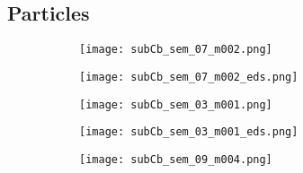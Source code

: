 \subsection{Particles}

\begin{figure}
    \centering
    \begin{subfigure}[t]{\textwidth}
        \caption{}\label{fig:subCb_silica}
          \begin{minipage}[t]{0.43\linewidth}
            \centering
            \texttt{[image: subCb\_sem\_07\_m002.png]}
          \end{minipage}
          \hfill
          \begin{minipage}[t]{0.43\linewidth}
            \centering
            \texttt{[image: subCb\_sem\_07\_m002\_eds.png]}
          \end{minipage}
          \begin{minipage}[t]{0.11\linewidth}
            \centering
            \atomicTable[&][&][&]
          \end{minipage}
    \end{subfigure}
    \par\bigskip
    \begin{subfigure}[t]{\textwidth}
        \caption{}\label{fig:subCb_Br-etch}
          \begin{minipage}[t]{0.43\linewidth}
            \centering
            \texttt{[image: subCb\_sem\_03\_m001.png]}
          \end{minipage}
          \hfill
          \begin{minipage}[t]{0.43\linewidth}
            \centering
            \texttt{[image: subCb\_sem\_03\_m001\_eds.png]}
          \end{minipage}
          \begin{minipage}[t]{0.11\linewidth}
            \centering
            \atomicTable[&][&][&]
          \end{minipage}
    \end{subfigure}
    \par\bigskip
    \begin{subfigure}[t]{\textwidth}
        \caption{}\label{fig:subCb_Br-etch2}
          \begin{minipage}[t]{0.43\linewidth}
            \centering
            \texttt{[image: subCb\_sem\_09\_m004.png]}
          \end{minipage}

\end{subfigure}
\end{figure}
